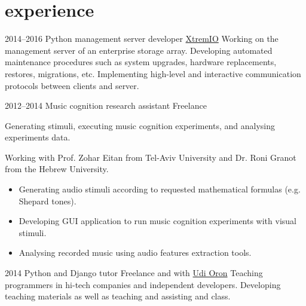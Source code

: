 \documentclass[]{friggeri-cv}
\begin{document}

\section{experience}

\begin{entrylist}

    \entry
    {2014--2016}
    {Python management server developer}
    {\href{http://xtremio.com/}{XtremIO}}
    {
      Working on the management server of an enterprise storage array.
      Developing automated maintenance procedures such as system upgrades, hardware replacements, restores, migrations, etc.
      Implementing high-level and interactive communication protocols between clients and server.
    }

\end{entrylist}
\begin{entrylist}

    \entry
    {2012--2014}
    {Music cognition research assistant}
    {Freelance}
    {
      Generating stimuli, executing music cognition experiments, and analysing experiments data.

      Working with Prof. Zohar Eitan from Tel-Aviv University and Dr. Roni Granot from the Hebrew University.
      \begin{itemize}
        \item
          Generating audio stimuli according to requested mathematical formulas (e.g. Shepard tones).
        \item
          Developing GUI application to run music cognition experiments with visual stimuli.
        \item
          Analysing recorded music using audio features extraction tools.
      \end{itemize}
    }

\end{entrylist}
\begin{entrylist}

    \entry
    {2014}
    {Python and Django tutor}
    {Freelance and with \href{http://www.10x.org.il/}{Udi Oron}}
    {
      Teaching programmers in hi-tech companies and independent developers.
      Developing teaching materials as well as teaching and assisting and class.
    }

\end{entrylist}
\end{document}
